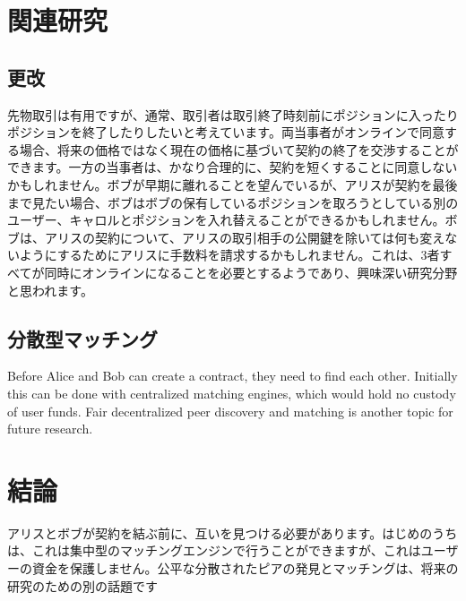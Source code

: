 \documentclass[11pt]{article}
\begin{document}
\section*{関連研究}

\subsection*{更改}

先物取引は有用ですが、通常、取引者は取引終了時刻前にポジションに入ったりポジションを終了したりしたいと考えています。両当事者がオンラインで同意する場合、将来の価格ではなく現在の価格に基づいて契約の終了を交渉することができます。一方の当事者は、かなり合理的に、契約を短くすることに同意しないかもしれません。ボブが早期に離れることを望んでいるが、アリスが契約を最後まで見たい場合、ボブはボブの保有しているポジションを取ろうとしている別のユーザー、キャロルとポジションを入れ替えることができるかもしれません。ボブは、アリスの契約について、アリスの取引相手の公開鍵を除いては何も変えないようにするためにアリスに手数料を請求するかもしれません。これは、3者すべてが同時にオンラインになることを必要とするようであり、興味深い研究分野と思われます。

\subsection*{分散型マッチング}

Before Alice and Bob can create a contract, they need to find each other.  Initially this can be done with centralized matching engines, which would hold no custody of user funds.  Fair decentralized peer discovery and matching is another topic for future research.

\section*{結論}

アリスとボブが契約を結ぶ前に、互いを見つける必要があります。はじめのうちは、これは集中型のマッチングエンジンで行うことができますが、これはユーザーの資金を保護しません。公平な分散されたピアの発見とマッチングは、将来の研究のための別の話題です




\end{document}
